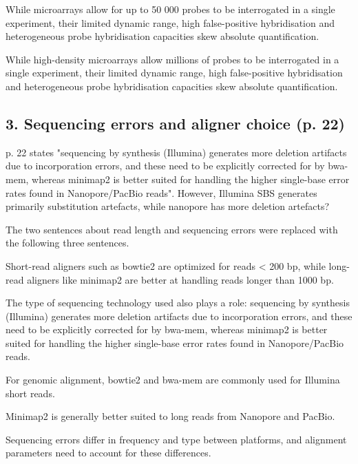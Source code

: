 \documentclass[11pt,a4paper]{article}
\begin{document}
\begin{removedtext}
While microarrays allow for up to 50 000 probes to be interrogated in a single experiment, their limited dynamic range, high false-positive hybridisation and heterogeneous probe hybridisation capacities skew absolute quantification.
\end{removedtext}
\begin{addedtext}
While high-density microarrays allow millions of probes to be interrogated in a single experiment, their limited dynamic range, high false-positive hybridisation and heterogeneous probe hybridisation capacities skew absolute quantification.
\end{addedtext}

\subsection*{\sffamily\color{heading}3. Sequencing errors and aligner choice (p. 22)}

\begin{reviewcomment}
p. 22 states "sequencing by synthesis (Illumina) generates more deletion artifacts due to incorporation errors, and these need to be explicitly corrected for by bwa-mem, whereas minimap2 is better suited for handling the higher single-base error rates found in Nanopore/PacBio reads". However, Illumina SBS generates primarily substitution artefacts, while nanopore has more deletion artefacts?
\end{reviewcomment}

The two sentences about read length and sequencing errors were replaced with the following three sentences.

\begin{removedtext}
Short-read aligners such as bowtie2 are optimized for reads < 200 bp, while long-read aligners like minimap2 are better at handling reads longer than 1000 bp.

The type of sequencing technology used also plays a role: sequencing by synthesis (Illumina) generates more deletion artifacts due to incorporation errors, and these need to be explicitly corrected for by bwa-mem, whereas minimap2 is better suited for handling the higher single-base error rates found in Nanopore/PacBio reads.
\end{removedtext}
\begin{addedtext}
For genomic alignment, bowtie2 and bwa-mem are commonly used for Illumina short reads.

Minimap2 is generally better suited to long reads from Nanopore and PacBio.

Sequencing errors differ in frequency and type between platforms, and alignment parameters need to account for these differences.
\end{addedtext}
\end{document}
